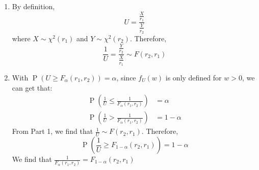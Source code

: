 \documentclass{huhtakm-template-book-v2}
\DeclareMathOperator{\prob}{P}
\begin{document}
\begin{proofing}
	\begin{enumerate}
		\item By definition,
		\begin{equation*}
			U=\frac{\frac{X}{r_{1}}}{\frac{Y}{r_{2}}}
		\end{equation*}
		where $X\sim\chi^{2}(r_{1})$ and $Y\sim\chi^{2}(r_{2})$. Therefore,
		\begin{equation*}
			\frac{1}{U}=\frac{\frac{Y}{r_{2}}}{\frac{X}{r_{1}}}\sim F(r_{2},r_{1})
		\end{equation*}
		\item With $\prob(U\geq F_{\alpha}(r_{1},r_{2}))=\alpha$, since $f_{U}(w)$ is only defined for $w>0$, we can get that:
		\begin{align*}
			\prob\left(\frac{1}{U}\leq\frac{1}{F_{\alpha}(r_{1},r_{2})}\right)&=\alpha\\
			\prob\left(\frac{1}{U}>\frac{1}{F_{\alpha}(r_{1},r_{2})}\right)&=1-\alpha
		\end{align*}
		From Part 1, we find that $\frac{1}{U}\sim F(r_{2},r_{1})$. Therefore,
		\begin{equation*}
			\prob\left(\frac{1}{U}\geq F_{1-\alpha}(r_{2},r_{1})\right)=1-\alpha
		\end{equation*}
		We find that $\frac{1}{F_{\alpha}(r_{1},r_{2})}=F_{1-\alpha}(r_{2},r_{1})$
	\end{enumerate}
\end{proofing}
\end{document}
